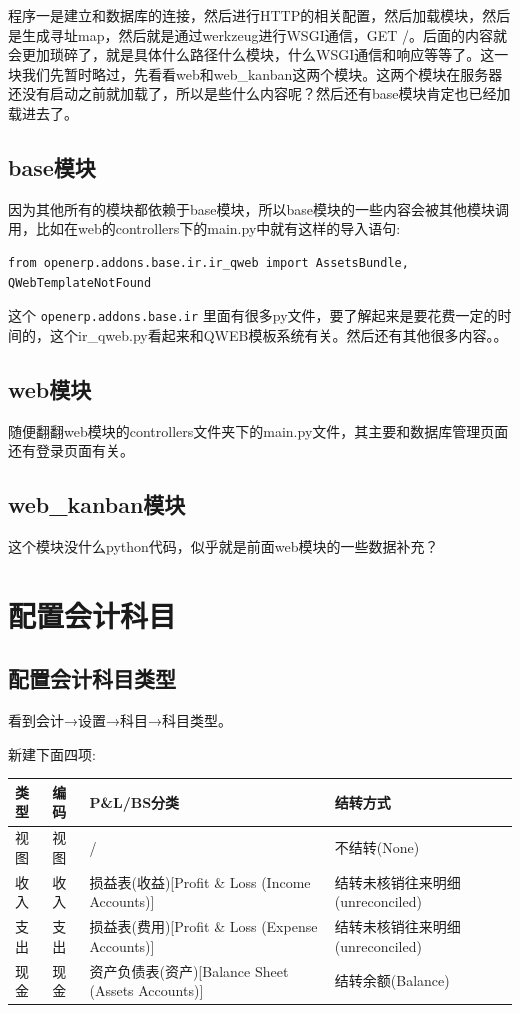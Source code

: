 \documentclass[11pt,a4paper]{sphinxmanual}
\begin{document}
程序一是建立和数据库的连接，然后进行HTTP的相关配置，然后加载模块，然后是生成寻址map，然后就是通过werkzeug进行WSGI通信，GET /。后面的内容就会更加琐碎了，就是具体什么路径什么模块，什么WSGI通信和响应等等了。这一块我们先暂时略过，先看看web和web\_kanban这两个模块。这两个模块在服务器还没有启动之前就加载了，所以是些什么内容呢？然后还有base模块肯定也已经加载进去了。

\subsection{base模块}
\label{sec-13-4-1}
因为其他所有的模块都依赖于base模块，所以base模块的一些内容会被其他模块调用，比如在web的controllers下的main.py中就有这样的导入语句:
\begin{Verbatim}
from openerp.addons.base.ir.ir_qweb import AssetsBundle, QWebTemplateNotFound
\end{Verbatim}

这个 \verb~openerp.addons.base.ir~ 里面有很多py文件，要了解起来是要花费一定的时间的，这个ir\_qweb.py看起来和QWEB模板系统有关。然后还有其他很多内容。。

\subsection{web模块}
\label{sec-13-4-2}
随便翻翻web模块的controllers文件夹下的main.py文件，其主要和数据库管理页面还有登录页面有关。

\subsection{web\_kanban模块}
\label{sec-13-4-3}
这个模块没什么python代码，似乎就是前面web模块的一些数据补充？







\section{配置会计科目}
\label{sec-13-5}

\subsection{配置会计科目类型}
\label{sec-13-5-1}
看到会计→设置→科目→科目类型。

新建下面四项:
\begin{center}
\begin{tabular}{llll}
\toprule
类型 & 编码 & P\&L/BS分类 & 结转方式\\
\midrule
视图 & 视图 & / & 不结转(None)\\
收入 & 收入 & 损益表(收益)[Profit \& Loss (Income Accounts)] & 结转未核销往来明细(unreconciled)\\
支出 & 支出 & 损益表(费用)[Profit \& Loss (Expense Accounts)] & 结转未核销往来明细(unreconciled)\\
现金 & 现金 & 资产负债表(资产)[Balance Sheet (Assets Accounts)] & 结转余额(Balance)\\
\bottomrule
\end{tabular}
\end{center}
\end{document}
